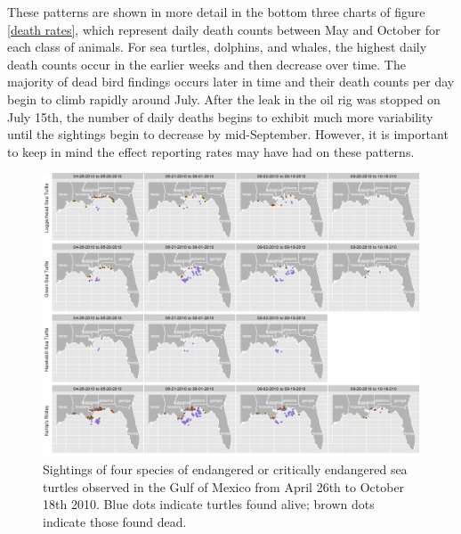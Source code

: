 \documentclass[authoryear,12pt]{elsarticle}
\begin{document}
These patterns are shown in more detail in  the  {bottom three} charts of figure \ref{death rates}, which represent daily death counts between May and October for each class of animals. For sea turtles, dolphins, and whales, the highest daily death counts occur in the earlier weeks and then decrease over time.  The majority of dead bird findings occurs later in time and their death counts per day begin to climb rapidly around July. After the leak  {in the oil rig} was stopped on July 15th, the number of daily deaths  {begins to exhibit much more} variability until {the sightings} begin to decrease by mid-September. 
However, it is important to keep in mind the effect reporting rates may have had on these patterns. 

\begin{figure}[htbp] %
   \centering
   \includegraphics[width=6in]{turtles.png} 
   \caption{Sightings of four species of endangered or critically endangered sea turtles observed in the Gulf of Mexico from April 26th to October 18th 2010.  Blue dots indicate turtles found alive; brown dots indicate those found dead.}
   \label{turtles}
\end{figure}
\end{document}

